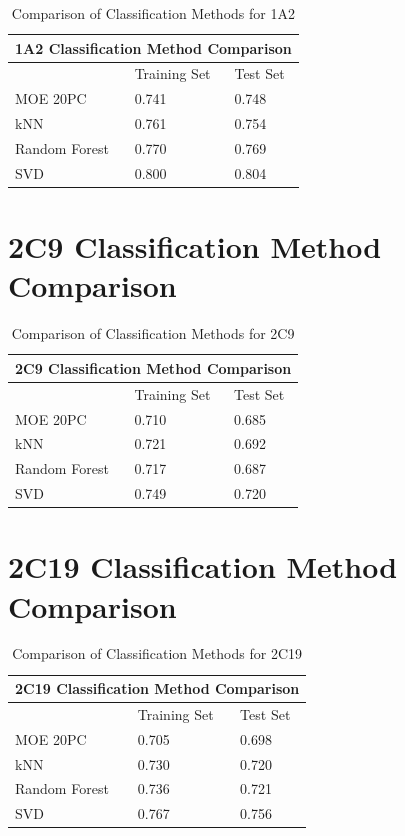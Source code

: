 \begin{table}[!htbp]
\begin{tabular}{|l|l|l|}
\hline
\multicolumn{3}{|c|}{1A2 Classification Method Comparison} \\ \hline
          & Training Set & Test Set \\ \hline
MOE 20PC  & 0.741        & 0.748    \\ \hline
kNN       & 0.761        & 0.754    \\ \hline
Random Forest & 0.770    & 0.769    \\ \hline
SVD       & 0.800        & 0.804    \\ \hline
\end{tabular}
\caption{Comparison of Classification Methods for 1A2}
\end{table}

\section{2C9 Classification Method Comparison}

\begin{table}[!htbp]
\begin{tabular}{|l|l|l|}
\hline
\multicolumn{3}{|c|}{2C9 Classification Method Comparison} \\ \hline
          & Training Set & Test Set \\ \hline
MOE 20PC  & 0.710        & 0.685    \\ \hline
kNN       & 0.721        & 0.692    \\ \hline
Random Forest & 0.717    & 0.687    \\ \hline
SVD       & 0.749        & 0.720    \\ \hline
\end{tabular}
\caption{Comparison of Classification Methods for 2C9}
\end{table}

\section{2C19 Classification Method Comparison}

\begin{table}[!htbp]
\begin{tabular}{|l|l|l|}
\hline
\multicolumn{3}{|c|}{2C19 Classification Method Comparison} \\ \hline
          & Training Set & Test Set \\ \hline
MOE 20PC  & 0.705        & 0.698    \\ \hline
kNN       & 0.730        & 0.720    \\ \hline
Random Forest & 0.736    & 0.721    \\ \hline
SVD       & 0.767        & 0.756    \\ \hline
\end{tabular}
\caption{Comparison of Classification Methods for 2C19}
\end{table}

